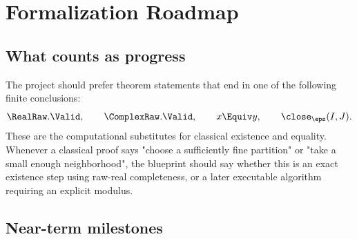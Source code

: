 \chapter{Formalization Roadmap}

\section{What counts as progress}

The project should prefer theorem statements that end in one of the following
finite conclusions:
\[
  \RealRaw.\Valid,\qquad
  \ComplexRaw.\Valid,\qquad
  x\Equiv y,\qquad
  \close_\eps(I,J).
\]
These are the computational substitutes for classical existence and equality.
Whenever a classical proof says "choose a sufficiently fine partition" or
"take a small enough neighborhood", the blueprint should say whether this is
an exact existence step using raw-real completeness, or a later executable
algorithm requiring an explicit modulus.

\section{Near-term milestones}

